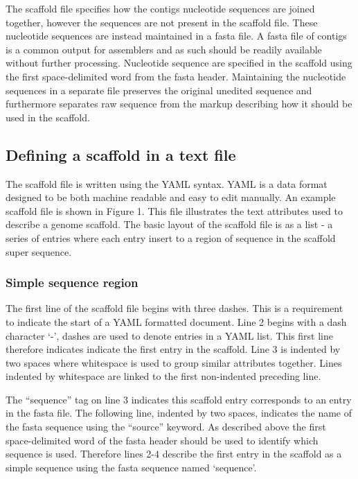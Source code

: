 \documentclass[10pt]{bmc_article}
\newenvironment{bmcformat}{\begin{raggedright}\baselineskip20pt\sloppy\setboolean{publ}{false}}{\end{raggedright}\baselineskip20pt\sloppy}
\begin{document}
\begin{bmcformat}
The scaffold file specifies how the contigs nucleotide sequences are joined
together, however the sequences are not present in the scaffold file. These
nucleotide sequences are instead maintained in a fasta file. A fasta file of
contigs is a common output for assemblers and as such should be readily
available without further processing. Nucleotide sequence are specified in the
scaffold using the first space-delimited word from the fasta header.
Maintaining the nucleotide sequences in a separate file preserves the original
unedited sequence and furthermore separates raw sequence from the markup
describing how it should be used in the scaffold. \pb

\subsection*{Defining a scaffold in a text file} %

The scaffold file is written using the YAML syntax. YAML is a data format
designed to be both machine readable and easy to edit manually. An example
scaffold file is shown in Figure 1. This file illustrates the text attributes
used to describe a genome scaffold. The basic layout of the scaffold file is as
a list - a series of entries where each entry insert to a region of sequence in
the scaffold super sequence. \pb

\subsubsection*{Simple sequence region} %

The first line of the scaffold file begins with three dashes. This is
a requirement to indicate the start of a YAML formatted document. Line 2 begins
with a dash character `-', dashes are used to denote entries in a YAML list.
This first line therefore indicates indicate the first entry in the scaffold.
Line 3 is indented by two spaces where whitespace is used to group similar
attributes together. Lines indented by whitespace are linked to the first
non-indented preceding line. \pb

The ``sequence'' tag on line 3 indicates this scaffold entry corresponds to an
entry in the fasta file. The following line, indented by two spaces, indicates
the name of the fasta sequence using the ``source'' keyword. As described above
the first space-delimited word of the fasta header should be used to identify
which sequence is used. Therefore lines 2-4 describe the first entry in the
scaffold as a simple sequence using the fasta sequence named `sequence'. \pb


\end{bmcformat}
\end{document}
